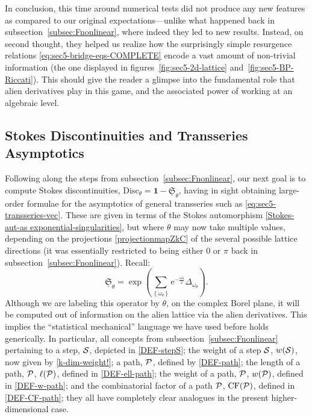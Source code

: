 \documentclass[11pt,a4paper]{article}
\newcommand{\CP}{{\cal P}}
\newcommand{\CS}{{\cal S}}
\newcommand{\be}{\begin{equation}}
\newcommand{\ee}{\end{equation}}
\def\1{\mathbf{1}}
\def\disc{{\mathrm{Disc}}}
\newcommand{\rme}{{\mathrm{e}}}
\begin{document}
In conclusion, this time around numerical tests did not produce any new features as compared to our original expectations---unlike what happened back in subsection~\ref{subsec:Fnonlinear}, where indeed they led to new results. Instead, on second thought, they helped us realize how the surprisingly simple resurgence relations \eqref{eq:sec5-bridge-eqs-COMPLETE} encode a vast amount of non-trivial information (the one displayed in figures~\ref{fig:sec5-2d-lattice} and~\ref{fig:sec5-BP-Riccati}). This should give the reader a glimpse into the fundamental role that alien derivatives play in this game, and the associated power of working at an algebraic level.

\subsection*{Stokes Discontinuities and Transseries Asymptotics}

Following along the steps from subsection~\ref{subsec:Fnonlinear}, our next goal is to compute Stokes discontinuities, $\disc_\theta = \1 - \underline{\mathfrak{S}}_\theta$, having in sight obtaining large-order formulae for the asymptotics of general transseries such as \eqref{eq:sec5-transseries-vec}. These are given in terms of the Stokes automorphism \eqref{Stokes-aut-as exponential-singularities}, but where $\theta$ may now take multiple values, depending on the projections \eqref{projectionmapZkC} of the several possible lattice directions (it was essentially restricted to being either $0$ or $\pi$ back in subsection~\ref{subsec:Fnonlinear}). Recall:
%
\be
\label{Stokes-aut-as exponential-singularities-AGAIN}
\underline{\mathfrak{S}}_\theta = \exp \left( \sum_{\left\{ \omega_\theta \right\}} \rme^{-\frac{\omega_\theta}{x}} \Delta_{\omega_\theta} \right).
\ee
%
\noindent
Although we are labeling this operator by $\theta$, on the complex Borel plane, it will be computed out of information on the alien lattice via the alien derivatives. This implies the ``statistical mechanical'' language we have used before holds generically. In particular, all concepts from subsection~\ref{subsec:Fnonlinear} pertaining to a step, $\CS$, depicted in \eqref{DEF-stepS}; the weight of a step $\CS$, $w(\CS)$, now given by \eqref{k-dim-weight!}; a path, $\CP$, defined by \eqref{DEF-path}; the length of a path, $\CP$, $\ell(\CP)$, defined in \eqref{DEF-ell-path}; the weight of a path, $\CP$, $w(\CP)$, defined in \eqref{DEF-w-path}; and the combinatorial factor of a path $\CP$, $\text{CF}(\CP)$, defined in \eqref{DEF-CF-path}; they all have completely clear analogues in the present higher-dimensional case.
\end{document}
